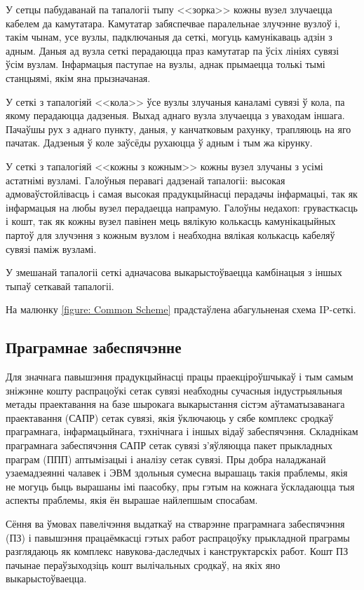 У сетцы пабудаванай па тапалогіі тыпу <<зорка>> кожны вузел
злучаецца кабелем да камутатара. Камутатар забяспечвае паралельнае
злучэнне вузлоў і, такім чынам, усе вузлы, падключаныя да сеткі,
могуць камунікаваць адзін з адным.
Даныя ад вузла сеткі перадаюцца праз камутатар па ўсіх лініях сувязі
ўсім вузлам. Інфармацыя паступае на вузлы, аднак прымаецца толькі
тымі станцыямі, якім яна прызначаная.

У сеткі з тапалогіяй <<кола>> ўсе вузлы злучаныя каналамі сувязі ў кола, па якому перадаюцца дадзеныя. Выхад аднаго вузла злучаецца з уваходам іншага. Пачаўшы рух з аднаго пункту, даныя, у канчатковым рахунку, трапляюць на яго пачатак. Дадзеныя ў коле заўсёды рухаюцца ў адным і тым жа кірунку.

У сеткі з тапалогіяй <<кожны з кожным>> кожны вузел злучаны з усімі
астатнімі вузламі. Галоўныя перавагі дадзенай тапалогіі: высокая
адмоваўстойлівасць і самая высокая прадукцыйнасці перадачы інфармацыі,
так як інфармацыя на любы вузел перадаецца напрамую. Галоўны недахоп:
грувасткасць і кошт, так як кожны вузел павінен мець вялікую колькасць
камунікацыйных партоў для злучэння з кожным вузлом і неабходна
вялікая колькасць кабеляў сувязі паміж вузламі.

У змешанай тапалогіі сеткі адначасова выкарыстоўваецца камбінацыя
з іншых тыпаў сеткавай тапалогіі.

На малюнку \ref{figure: Common Scheme} прадстаўлена
абагульненая схема IP-сеткі.

\subsection{Праграмнае забеспячэнне}

Для значнага павышэння прадукцыйнасці працы праекціроўшчыкаў і тым самым зніжэнне кошту распрацоўкі сетак сувязі неабходны сучасныя індустрыяльныя метады праектавання на базе шырокага выкарыстання сістэм аўтаматызаванага праектавання (САПР) сетак сувязі, якія ўключаюць у сябе комплекс сродкаў праграмнага, інфармацыйнага, тэхнічнага і іншых відаў забеспячэння.
Складнікам праграмнага забеспячэння САПР сетак сувязі з'яўляюцца пакет прыкладных праграм (ППП) аптымізацыі і аналізу сетак сувязі. Пры добра наладжанай узаемадзеянні чалавек і ЭВМ здольныя сумесна вырашаць такія праблемы, якія не могуць быць вырашаны імі паасобку, пры гэтым на кожнага ўскладаюцца тыя аспекты праблемы, якія ён вырашае найлепшым спосабам.

Сёння ва ўмовах павелічэння выдаткаў на стварэнне праграмнага забеспячэння (ПЗ) і павышэння працаёмкасці гэтых работ распрацоўку прыкладной праграмы разглядаюць як комплекс навукова-даследчых і канструктарскіх работ.
Кошт ПЗ пачынае пераўзыходзіць кошт вылічальных сродкаў, на якіх яно
выкарыстоўваецца.

